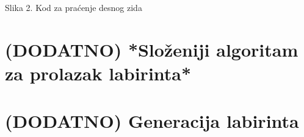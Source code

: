 Slika 2. Kod za praćenje desnog zida

    \section{(DODATNO) *Složeniji algoritam za prolazak labirinta*}

    \section{(DODATNO) Generacija labirinta}
\fi

